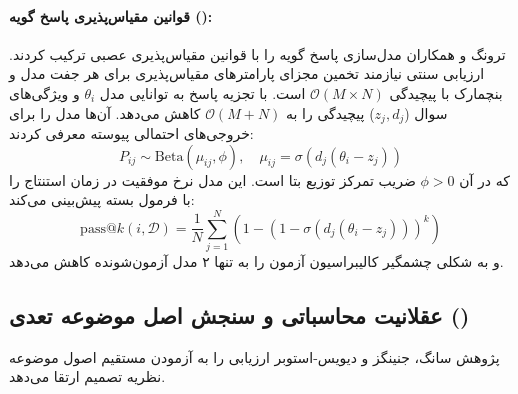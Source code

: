 \paragraph*{قوانین مقیاس‌پذیری پاسخ گویه ():}
ترونگ و همکاران \cite{truong2026item} مدل‌سازی پاسخ گویه را با قوانین مقیاس‌پذیری عصبی ترکیب کردند. ارزیابی سنتی نیازمند تخمین مجزای پارامترهای مقیاس‌پذیری برای هر جفت مدل و بنچمارک با پیچیدگی $\mathcal{O}(M \times N)$ است.  با تجزیه پاسخ به توانایی مدل $\theta_i$ و ویژگی‌های سوال ($z_j, d_j$) پیچیدگی را به $\mathcal{O}(M + N)$ کاهش می‌دهد.
آن‌ها مدل \textbf{} را برای خروجی‌های احتمالی پیوسته معرفی کردند:
\begin{equation}
    P_{ij} \sim \text{Beta}(\mu_{ij}, \phi), \quad \mu_{ij} = \sigma(d_j(\theta_i - z_j))
\end{equation}
که در آن $\phi > 0$ ضریب تمرکز توزیع بتا است. این مدل نرخ موفقیت در زمان استنتاج را با فرمول بسته پیش‌بینی می‌کند:
\begin{equation}
    \text{pass}@k(i, \mathcal{D}) = \frac{1}{N} \sum_{j=1}^N \left( 1 - \left(1 - \sigma(d_j(\theta_i - z_j))\right)^k \right)
\end{equation}
و به شکلی چشمگیر کالیبراسیون آزمون را به تنها ۲ مدل آزمون‌شونده کاهش می‌دهد.

\subsection*{عقلانیت محاسباتی و سنجش اصل موضوعه تعدی ()}
پژوهش سانگ، جنینگز و دیویس-استوبر \cite{song2026benchmarking} ارزیابی را به آزمودن مستقیم اصول موضوعه نظریه تصمیم ارتقا می‌دهد.

